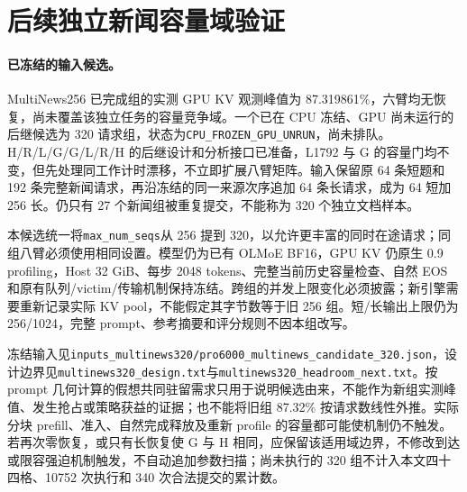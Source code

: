 \documentclass[UTF8,fontset=fandol,a4paper,10pt]{ctexart}
\newcommand{\code}[1]{\nolinkurl{#1}}
\begin{document}
\section{后续独立新闻容量域验证}
\paragraph{已冻结的输入候选。}
MultiNews256 已完成组的实测 GPU KV 观测峰值为 87.319861\%，六臂均无恢复，尚未覆盖该独立任务的容量竞争域。一个已在 CPU 冻结、GPU 尚未运行的后继候选为 320 请求组，状态为\code{CPU_FROZEN_GPU_UNRUN}，尚未排队。H/R/L/G/G/L/R/H 的后继设计和分析接口已准备，L1792 与 G 的容量门均不变，但先处理同工作计时漂移，不立即扩展八臂矩阵。输入保留原 64 条短题和 192 条完整新闻请求，再沿冻结的同一来源次序追加 64 条长请求，成为 64 短加 256 长。仍只有 27 个新闻组被重复提交，不能称为 320 个独立文档样本。

本候选统一将\code{max_num_seqs}从 256 提到 320，以允许更丰富的同时在途请求；同组八臂必须使用相同设置。模型仍为已有 OLMoE BF16，GPU KV 仍原生 0.9 profiling，Host 32 GiB、每步 2048 tokens、完整当前历史容量检查、自然 EOS 和原有队列/victim/传输机制保持冻结。跨组的并发上限变化必须披露；新引擎需要重新记录实际 KV pool，不能假定其字节数等于旧 256 组。短/长输出上限仍为 256/1024，完整 prompt、参考摘要和评分规则不因本组改写。

冻结输入见\code{inputs_multinews320/pro6000_multinews_candidate_320.json}，设计边界见\code{multinews320_design.txt}与\code{multinews320_headroom_next.txt}。按 prompt 几何计算的假想共同驻留需求只用于说明候选由来，不能作为新组实测峰值、发生抢占或策略获益的证据；也不能将旧组 87.32\% 按请求数线性外推。实际分块 prefill、准入、自然完成释放及重新 profile 的容量都可能使机制仍不触发。若再次零恢复，或只有长恢复使 G 与 H 相同，应保留该适用域边界，不修改到达或限容强迫机制触发，不自动追加参数扫描；尚未执行的 320 组不计入本文四十四格、10752 次执行和 340 次合法提交的累计数。
\end{document}
